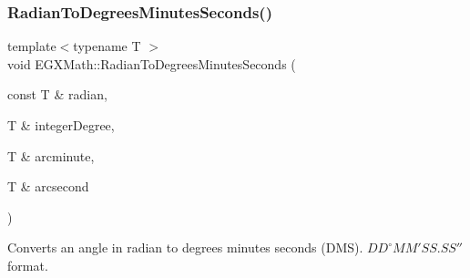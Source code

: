 \subsubsection{\texorpdfstring{Radian\+To\+Degrees\+Minutes\+Seconds()}{RadianToDegreesMinutesSeconds()}}
{\footnotesize\ttfamily template$<$typename T $>$ \\
void E\+G\+X\+Math\+::\+Radian\+To\+Degrees\+Minutes\+Seconds (\begin{DoxyParamCaption}\item[{const T \&}]{radian,  }\item[{T \&}]{integer\+Degree,  }\item[{T \&}]{arcminute,  }\item[{T \&}]{arcsecond }\end{DoxyParamCaption})}



Converts an angle in radian to degrees minutes seconds (D\+MS). ${DD}^{\circ}{MM}'{SS.SS}''$ format. 


